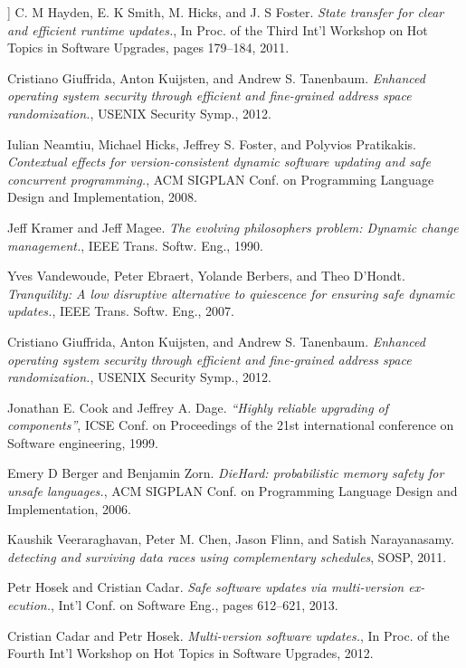 \documentclass[a4paper,11pt,twoside]{article}
\begin{document}
\begin{thebibliography}{1}
   ] C. M Hayden, E. K Smith, M. Hicks, and J. S Foster. {\em State transfer for clear and efficient runtime updates.}, In Proc. of the Third Int’l Workshop on Hot Topics in Software Upgrades, pages 179–184, 2011.

   Cristiano Giuffrida, Anton Kuijsten, and Andrew S. Tanenbaum. {\em Enhanced operating system security through efficient and fine-grained address space randomization.}, USENIX Security Symp., 2012.

   Iulian Neamtiu, Michael Hicks, Jeffrey S. Foster, and Polyvios Pratikakis. {\em Contextual effects for version-consistent dynamic software updating and safe concurrent programming.}, ACM SIGPLAN Conf. on Programming Language Design and Implementation, 2008. 

   Jeff Kramer and Jeff Magee. {\em The evolving philosophers problem: Dynamic change management.}, IEEE Trans. Softw. Eng., 1990. 

  Yves Vandewoude, Peter Ebraert, Yolande Berbers, and Theo D’Hondt. {\em Tranquility: A low disruptive alternative to quiescence for ensuring safe dynamic updates.}, IEEE Trans. Softw. Eng., 2007.

 Cristiano Giuffrida, Anton Kuijsten, and Andrew S. Tanenbaum. {\em Enhanced operating system security through efficient and fine-grained address space randomization.}, USENIX Security Symp., 2012.

  Jonathan E. Cook and	Jeffrey A. Dage. {\em “Highly reliable upgrading of components”}, ICSE Conf. on Proceedings of the 21st international conference on Software engineering, 1999.

  Emery D Berger and Benjamin Zorn. {\em DieHard: probabilistic memory safety for unsafe languages.}, ACM SIGPLAN Conf. on Programming Language Design and Implementation, 2006.
 
  Kaushik Veeraraghavan, Peter M. Chen, Jason Flinn, and Satish Narayanasamy. {\em detecting and surviving data races using complementary schedules}, SOSP, 2011. 
 
  Petr Hosek and Cristian Cadar. {\em Safe software updates via multi-version ex- ecution.}, Int’l Conf. on Software Eng., pages 612–621, 2013.
 
  Cristian Cadar and Petr Hosek. {\em Multi-version software updates.}, In Proc. of the Fourth Int’l Workshop on Hot Topics in Software Upgrades, 2012.


\end{thebibliography}
\end{document}
